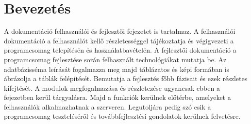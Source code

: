 \part{Bevezetés}
A dokumentáció felhasználói és fejlesztői fejezetet is tartalmaz. A felhasználói dokumentáció a felhasználót kellő részletességgel tájékoztatja és végigvezeti a programcsomag telepítésén és használatbavételén. A fejlesztői dokumentáció a programcsomag fejlesztése során felhasznált technológiákat mutatja be. Az adatbázisséma leírását fogalmazza meg majd táblázatos és képi formában is ábrázolja a táblák felépítését. Bemutatja a fejlesztés főbb fázisait és ezek részletes kifejtését. A modulok megfogalmazása és részletezése ugyancsak ebben a fejezetben kerül tárgyalásra. Majd a funkciók kerülnek előtérbe, amelyeket a felhasználók alkalmazhatnak a szerveren. Legutoljára pedig szó esik a programcsomag teszteléséről és továbbfejlesztési gondolatok kerülnek felvetésre.

\clearpage
